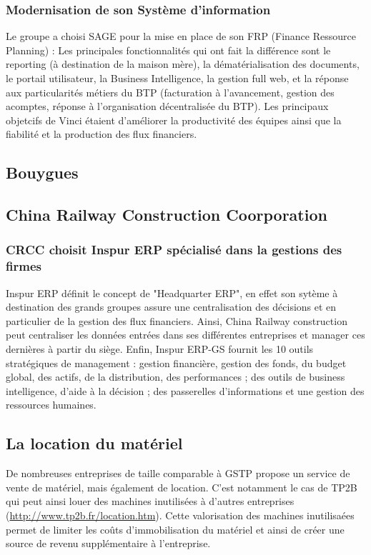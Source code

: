 \subsubsection{Modernisation de son Système d'information}
Le groupe a choisi SAGE pour la mise en place de son FRP (Finance Ressource Planning) :
Les principales fonctionnalités qui ont fait la différence sont le reporting (à destination de la maison mère), la dématérialisation des documents, le portail utilisateur, la Business Intelligence, la gestion full web, et la réponse aux particularités métiers du BTP (facturation à l'avancement, gestion des acomptes, réponse à l'organisation décentralisée du BTP).
Les principaux objetcifs de Vinci étaient d'améliorer la productivité des équipes ainsi que la fiabilité et la production des flux financiers.

\subsection{Bouygues}
\subsection{China Railway Construction Coorporation}

\subsubsection{CRCC choisit Inspur ERP spécialisé dans la gestions des firmes}
Inspur ERP définit le concept de "Headquarter ERP", en effet son sytème à destination des grands groupes assure une centralisation des décisions et en particulier de la gestion des flux financiers.
Ainsi, China Railway construction peut centraliser les données entrées dans ses différentes entreprises et manager ces dernières à partir du siège.
Enfin, Inspur ERP-GS fournit les 10 outils stratégiques de management : gestion financière, gestion des fonds, du budget global, des actifs, de la distribution, des performances ; des outils de business intelligence, d'aide à la décision ; des passerelles d'informations et une gestion des ressources humaines.


\subsection{La location du matériel}
De nombreuses entreprises de taille comparable à GSTP propose un service de vente de matériel, mais également de location. 
C'est notamment le cas de TP2B qui peut ainsi louer des machines inutilisées à d'autres entreprises (\url{http://www.tp2b.fr/location.htm}).
Cette valorisation des machines inutilisaées permet de limiter les coûts d'immobilisation du matériel et ainsi de créer une source de revenu supplémentaire à l'entreprise.

